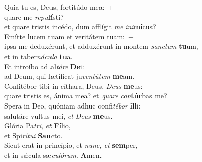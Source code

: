 \evenverse Quia tu es, Deus, fortitúdo mea:~+\\\evenverse  quare me \textit{re}\textit{pu}\textbf{lí}sti?~\*\\
\evenverse et quare tristis incédo, dum afflígit \textit{me} \textit{i}\textit{ni}\textbf{mí}cus?\\
\oddverse Emítte lucem tuam et veritátem tuam:~+\\
\oddverse  ipsa me deduxérunt, et adduxérunt in montem \textit{san}\textit{ctum} \textbf{tu}um,~\*\\
\oddverse et in taber\textit{ná}\textit{cu}\textit{la} \textbf{tu}a.\\
\evenverse Et introíbo ad al\textit{tá}\textit{re} \textbf{De}i:~\*\\
\evenverse ad Deum, qui lætíficat ju\textit{ven}\textit{tú}\textit{tem} \textbf{me}am.\\
\oddverse Confitébor tibi in cíthara, Deus, \textit{De}\textit{us} \textbf{me}us:~\*\\
\oddverse quare tristis es, ánima mea? et \textit{qua}\textit{re} \textit{con}\textbf{túr}bas me?\\
\evenverse Spera in Deo, quóniam adhuc confi\textit{té}\textit{bor} \textbf{il}li:~\*\\
\evenverse salutáre vultus mei, \textit{et} \textit{De}\textit{us} \textbf{me}us.\\
\oddverse Glória Pa\textit{tri}, \textit{et} \textbf{Fí}lio,~\*\\
\oddverse et Spi\textit{rí}\textit{tu}\textit{i} \textbf{San}cto.\\
\evenverse Sicut erat in princípio, et \textit{nunc}, \textit{et} \textbf{sem}per,~\*\\
\evenverse et in sǽcula sæ\textit{cu}\textit{ló}\textit{rum}. \textbf{A}men.\\
